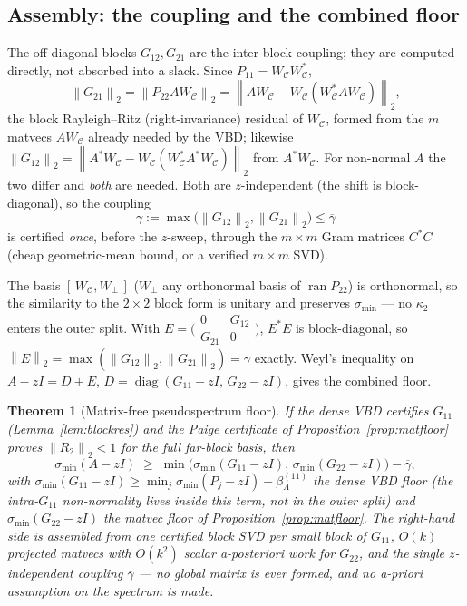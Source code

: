 \documentclass[11pt,a4paper]{article}
\newcommand{\norm}[1]{\left\|#1\right\|}
\newcommand{\diag}{\operatorname{diag}}
\theoremstyle{plain}
\newtheorem{theorem}{Theorem}[section]
\theoremstyle{definition}
\begin{document}
\subsection*{Assembly: the coupling and the combined floor}

The off-diagonal blocks $G_{12},G_{21}$ are the inter-block coupling; they are computed
directly, not absorbed into a slack. Since $P_{11}=W_{\mathcal C}W_{\mathcal C}^{*}$,
\[
  \norm{G_{21}}_2=\norm{P_{22}AW_{\mathcal C}}_2
  =\norm{AW_{\mathcal C}-W_{\mathcal C}(W_{\mathcal C}^{*}AW_{\mathcal C})}_2,
\]
the block Rayleigh--Ritz (right-invariance) residual of $W_{\mathcal C}$, formed from the
$m$ matvecs $AW_{\mathcal C}$ already needed by the VBD; likewise
$\norm{G_{12}}_2=\norm{A^{*}W_{\mathcal C}-W_{\mathcal C}(W_{\mathcal C}^{*}A^{*}W_{\mathcal C})}_2$
from $A^{*}W_{\mathcal C}$. For non-normal $A$ the two differ and \emph{both} are needed.
Both are $z$-independent (the shift is block-diagonal), so the coupling
\[
  \gamma:=\max\!\bigl(\norm{G_{12}}_2,\norm{G_{21}}_2\bigr)\le\overline\gamma
\]
is certified \emph{once}, before the $z$-sweep, through the $m\times m$ Gram matrices
$C^{*}C$ (cheap geometric-mean bound, or a verified $m\times m$ SVD).

The basis $[\,W_{\mathcal C},W_\perp\,]$ ($W_\perp$ any orthonormal basis of
$\operatorname{ran}P_{22}$) is orthonormal, so the similarity to the $2\times2$ block form
is unitary and preserves $\sigma_{\min}$ --- no $\kappa_2$ enters the outer split. With
$E=\bigl(\begin{smallmatrix}0&G_{12}\\G_{21}&0\end{smallmatrix}\bigr)$, $E^{*}E$ is
block-diagonal, so $\norm{E}_2=\max(\norm{G_{12}}_2,\norm{G_{21}}_2)=\gamma$ exactly.
Weyl's inequality on $A-zI=D+E$, $D=\diag(G_{11}-zI,\,G_{22}-zI)$, gives the combined floor.

\begin{theorem}[Matrix-free pseudospectrum floor]\label{thm:matfree}
If the dense VBD certifies $G_{11}$ (Lemma~\ref{lem:blockres}) and the Paige certificate of
Proposition~\ref{prop:matfloor} proves $\norm{R_2}_2<1$ for the full far-block basis, then
\[
  \sigma_{\min}(A-zI)\;\ge\;
  \min\!\bigl(\sigma_{\min}(G_{11}-zI),\,\sigma_{\min}(G_{22}-zI)\bigr)-\overline\gamma,
\]
with $\sigma_{\min}(G_{11}-zI)\ge\min_{j}\sigma_{\min}(P_j-zI)-\beta_\Lambda^{(11)}$ the
dense VBD floor (the intra-$G_{11}$ non-normality lives inside this term, not in the outer
split) and $\sigma_{\min}(G_{22}-zI)$ the matvec floor of
Proposition~\ref{prop:matfloor}. The right-hand side is assembled from one certified block
SVD per small block of $G_{11}$, $O(k)$ projected matvecs with $O(k^2)$ scalar a-posteriori
work for $G_{22}$, and the single $z$-independent coupling $\overline\gamma$ --- no global
matrix is ever formed, and no a-priori assumption on the spectrum is made.
\end{theorem}
\end{document}
